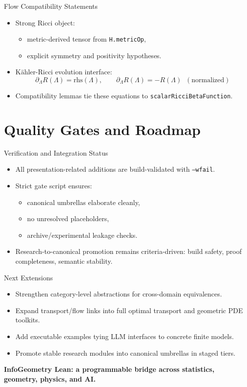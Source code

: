 \documentclass[aspectratio=169]{beamer}
\begin{document}
\begin{frame}{Flow Compatibility Statements}
  \begin{itemize}
    \item Strong Ricci object:
    \begin{itemize}
      \item metric-derived tensor from \texttt{H.metricOp},
      \item explicit symmetry and positivity hypotheses.
    \end{itemize}
    \item K\"ahler-Ricci evolution interface:
    \[
      \partial_\Lambda R(\Lambda) = \text{rhs}(\Lambda), \qquad
      \partial_\Lambda R(\Lambda) = -R(\Lambda)\;\;(\text{normalized})
    \]
    \item Compatibility lemmas tie these equations to \texttt{scalarRicciBetaFunction}.
  \end{itemize}
\end{frame}

\section{Quality Gates and Roadmap}

\begin{frame}{Verification and Integration Status}
  \begin{itemize}
    \item All presentation-related additions are build-validated with \texttt{--wfail}.
    \item Strict gate script ensures:
    \begin{itemize}
      \item canonical umbrellas elaborate cleanly,
      \item no unresolved placeholders,
      \item archive/experimental leakage checks.
    \end{itemize}
    \item Research-to-canonical promotion remains criteria-driven:
    build safety, proof completeness, semantic stability.
  \end{itemize}
\end{frame}

\begin{frame}{Next Extensions}
  \begin{itemize}
    \item Strengthen category-level abstractions for cross-domain equivalences.
    \item Expand transport/flow links into full optimal transport and geometric PDE toolkits.
    \item Add executable examples tying LLM interfaces to concrete finite models.
    \item Promote stable research modules into canonical umbrellas in staged tiers.
  \end{itemize}
  \vspace{0.8em}
  \centering
  \textbf{InfoGeometry Lean: a programmable bridge across statistics, geometry, physics, and AI.}
\end{frame}
\end{document}
